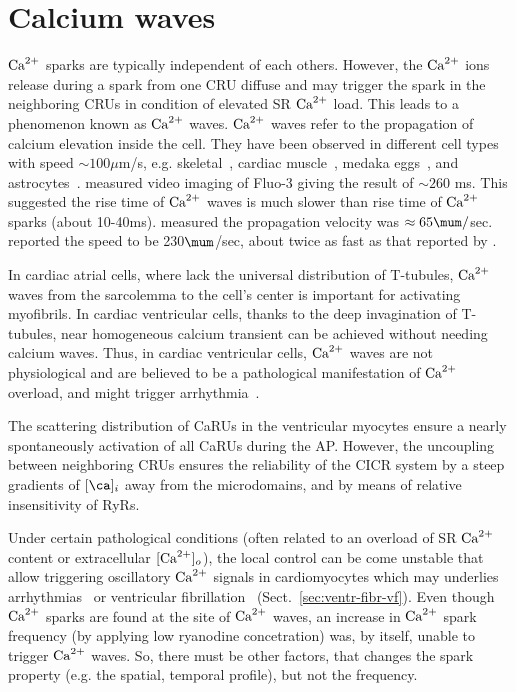 \section{Calcium waves}
\label{sec:calcium-waves}

${\text{Ca}^{2+}}$ sparks are typically independent of each others. However, the ${\text{Ca}^{2+}}$ ions
release during a spark from one CRU diffuse and may trigger the spark in the
neighboring CRUs in condition of elevated SR ${\text{Ca}^{2+}}$ load. This leads to a
phenomenon known as ${\text{Ca}^{2+}}$ waves. ${\text{Ca}^{2+}}$ waves refer to the propagation of calcium
elevation inside the cell.
They have been observed in different cell types with speed $\sim 100\mu$m/s,
e.g.
skeletal~\citep{endo1970}, cardiac muscle~\citep{fabiato1972}, medaka
eggs~\citep{ridgway1977}, and astrocytes~\citep{cornell-bell1991}.
\citep{engel1995} measured video imaging of Fluo-3 giving the result of $\sim
260$ ms. This suggested the rise time of ${\text{Ca}^{2+}}$ waves is much slower than rise
time of ${\text{Ca}^{2+}}$ sparks (about 10-40ms). \citep{lipp1994} measured the propagation
velocity was $\approx 65 \mum/$sec. \citep{parker1996csi} reported the speed to
be 230$\mum$/sec, about twice as fast as that reported by \citep{cheng1996csc}.

In cardiac atrial cells, where lack the universal distribution of
T-tubules, ${\text{Ca}^{2+}}$ waves from the sarcolemma to the cell's center is
important for activating myofibrils. In cardiac ventricular cells,
thanks to the deep invagination of T-tubules, near homogeneous calcium
transient can be achieved without needing calcium waves. Thus, in
cardiac ventricular cells, ${\text{Ca}^{2+}}$ waves are not physiological and are
believed to be a pathological manifestation of ${\text{Ca}^{2+}}$ overload, and
might trigger arrhythmia~\citep{lakatta1993}.

\begin{framed}
  The scattering distribution of CaRUs in the ventricular myocytes
  ensure a nearly spontaneously activation of all CaRUs during the
  AP. However, the uncoupling between neighboring CRUs ensures the
  reliability of the CICR system by a steep gradients of $[\ca]_i$ away
  from the microdomains, and by means of relative insensitivity of RyRs.
\end{framed}

Under certain pathological conditions (often related to an overload of
SR ${\text{Ca}^{2+}}$ content or extracellular $[{\text{Ca}^{2+}}]_o$), the local control can be come
unstable that allow triggering oscillatory ${\text{Ca}^{2+}}$  signals in cardiomyocytes
which may underlies arrhythmias~\citep{katra2005,venetucci2008} or ventricular
fibrillation~\citep{lakatta1993} (Sect.~\ref{sec:ventr-fibr-vf}). Even though
${\text{Ca}^{2+}}$ sparks are found at the site of ${\text{Ca}^{2+}}$ waves, an increase in ${\text{Ca}^{2+}}$ spark
frequency (by applying low ryanodine concetration) was, by itself,  unable to
trigger ${\text{Ca}^{2+}}$ waves. So, there must be other factors, that changes the  spark
property (e.g. the spatial, temporal profile), but not the frequency. 


